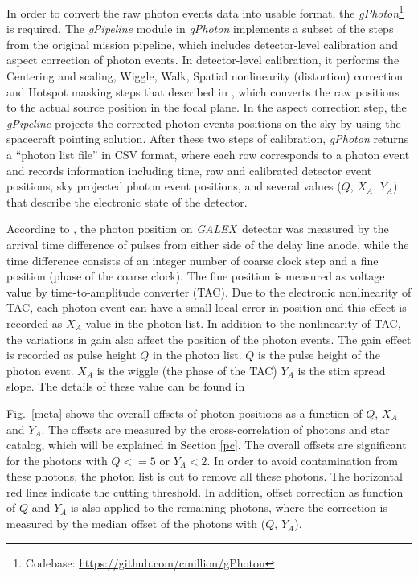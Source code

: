 \documentclass[12pt, preprint]{aastex}
\newcommand{\project}[1]{\textsl{#1}}
\newcommand{\galex}{\project{GALEX}}
\begin{document}
In order to convert the raw photon events data into usable format, the \project{gPhoton}\footnote{Codebase: \url{https://github.com/cmillion/gPhoton} } \citep[][]{gPhoton_code} is required.
The \project{gPipeline} module in \project{gPhoton} implements a subset of the steps from the original mission pipeline\citep{galex_cal}, which includes detector-level calibration and aspect correction of photon events.
In detector-level calibration, it performs the Centering and scaling, Wiggle, Walk, Spatial nonlinearity (distortion) correction and Hotspot masking steps that described in \cite{galex_cal}, which converts the raw positions to the actual source position in the focal plane.
In the aspect correction step, the \project{gPipeline} projects the corrected photon events positions on the sky by using the spacecraft pointing solution.
After these two steps of calibration, \project{gPhoton} returns a “photon list file” in CSV format, where each row corresponds to a photon event and records information including time, raw and calibrated detector event positions, sky projected photon event positions, and several values ($Q$, $X_A$, $Y_A$) that describe the electronic state of the detector.

According to \cite{galex_cal}, the photon position on \galex\ detector was measured by the arrival time difference of pulses from either side of the delay line anode, while the time difference consists of an integer number of coarse clock step and a fine position (phase of the coarse clock).
The fine position is measured as voltage value by time-to-amplitude converter (TAC).
Due to the electronic nonlinearity of TAC, each photon event can have a small local error in position and this effect is recorded as $X_A$ value in the photon list.
In addition to the nonlinearity of TAC, the variations in gain also affect the position of the photon events.
The gain effect is recorded as pulse height $Q$ in the photon list.
$Q$ is the pulse height of the photon event.
$X_A$ is the wiggle (the phase of the TAC)
$Y_A$ is the stim spread slope.
The details of these value can be found in \cite{galex_cal}

Fig.~\ref{meta} shows the overall offsets of photon positions as a function of $Q$, $X_A$ and $Y_A$.
The offsets are measured by the cross-correlation of photons and star catalog, which will be explained in Section \ref{pc}.
The overall offsets are significant for the photons with $Q<=5$ or $Y_A<2$.
In order to avoid contamination from these photons, the photon list is cut to remove all these photons.
The horizontal red lines indicate the cutting threshold.
In addition, offset correction as function of $Q$ and $Y_A$ is also applied to the remaining photons, where the correction is measured by the median offset of the photons with ($Q$, $Y_A$).
\end{document}
